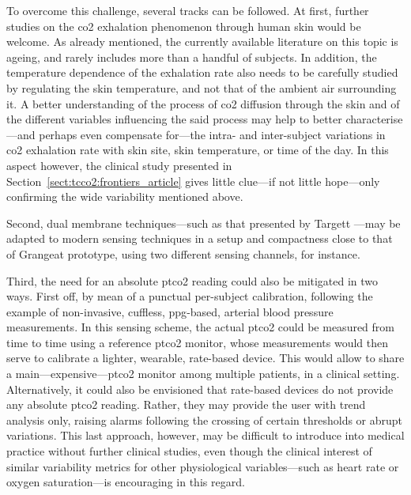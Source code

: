 \mfrin{}To overcome this challenge, several tracks can be followed. At first, further studies on the \gls{co2} exhalation phenomenon through human skin would be welcome. As already mentioned, the currently available literature on this topic is ageing, and rarely includes more than a handful of subjects. In addition, the temperature dependence of the exhalation rate also needs to be carefully studied by regulating the skin temperature, and not that of the ambient air surrounding it. A better understanding of the process of \gls{co2} diffusion through the skin and of the different variables influencing the said process may help to better characterise---and perhaps even compensate for---the intra- and inter-subject variations in \gls{co2} exhalation rate with skin site, skin temperature, or time of the day. In this aspect however, the clinical study presented in Section~\ref{sect:tcco2:frontiers_article} gives little clue---if not little hope---only confirming the wide variability mentioned above.

Second, dual membrane techniques---such as that presented by Targett \etal{}\cite{targett1984}---may be adapted to modern sensing techniques in a setup and compactness close to that of Grangeat \etal{}\cite{grangeat2019} prototype, using two different sensing channels, for instance.

Third, the need for an absolute \gls{ptco2} reading could also be mitigated in two ways. First off, by mean of a punctual per-subject calibration, following the example of non-invasive, cuffless, \gls{ppg}-based, arterial blood pressure measurements\cite{xing2019, shao2020}. In this sensing scheme, the actual \gls{ptco2} could be measured from time to time using a reference \gls{ptco2} monitor, whose measurements would then serve to calibrate a lighter, wearable, rate-based device. This would allow to share a main---expensive---\gls{ptco2} monitor among multiple patients, in a clinical setting. Alternatively, it could also be envisioned that rate-based devices do not provide any absolute \gls{ptco2} reading. Rather, they may provide the user with trend analysis only, raising alarms following the crossing of certain thresholds or abrupt variations. This last approach, however, may be difficult to introduce into medical practice without further clinical studies, even though the clinical interest of similar variability metrics for other physiological variables---such as heart rate\cite{kim2018} or oxygen saturation\cite{moret2014, clarke2016}---is encouraging in this regard.

